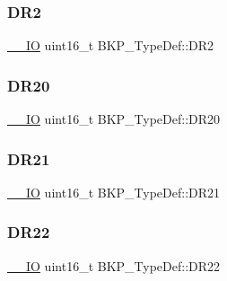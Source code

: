 \mbox{\label{struct_b_k_p___type_def_a98d088136a3ba92025a8381d9a19f7b0}} 
\subsubsection{\texorpdfstring{DR2}{DR2}}
{\footnotesize\ttfamily \mbox{\hyperlink{group___c_m_s_i_s___c_m3__core__definitions_gaec43007d9998a0a0e01faede4133d6be}{\+\_\+\+\_\+\+IO}} uint16\+\_\+t B\+K\+P\+\_\+\+Type\+Def\+::\+D\+R2}

\mbox{\label{struct_b_k_p___type_def_a107bde73006459510e9ba42579f6c327}} 
\subsubsection{\texorpdfstring{DR20}{DR20}}
{\footnotesize\ttfamily \mbox{\hyperlink{group___c_m_s_i_s___c_m3__core__definitions_gaec43007d9998a0a0e01faede4133d6be}{\+\_\+\+\_\+\+IO}} uint16\+\_\+t B\+K\+P\+\_\+\+Type\+Def\+::\+D\+R20}

\mbox{\label{struct_b_k_p___type_def_a89180a525bf44cd1747dd97102de7a5a}} 
\subsubsection{\texorpdfstring{DR21}{DR21}}
{\footnotesize\ttfamily \mbox{\hyperlink{group___c_m_s_i_s___c_m3__core__definitions_gaec43007d9998a0a0e01faede4133d6be}{\+\_\+\+\_\+\+IO}} uint16\+\_\+t B\+K\+P\+\_\+\+Type\+Def\+::\+D\+R21}

\mbox{\label{struct_b_k_p___type_def_a9f077d302b8fb5f113416919de36c1fb}} 
\subsubsection{\texorpdfstring{DR22}{DR22}}
{\footnotesize\ttfamily \mbox{\hyperlink{group___c_m_s_i_s___c_m3__core__definitions_gaec43007d9998a0a0e01faede4133d6be}{\+\_\+\+\_\+\+IO}} uint16\+\_\+t B\+K\+P\+\_\+\+Type\+Def\+::\+D\+R22}

